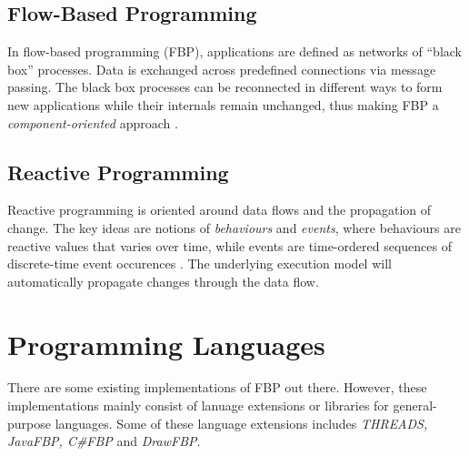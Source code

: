 \subsection{Flow-Based Programming}
In flow-based programming (FBP), applications are defined as networks
of ``black box'' processes. Data is exchanged across predefined
connections via message passing. The black box processes can be
reconnected in different ways to form new applications while their
internals remain unchanged, thus making FBP a
\emph{component-oriented} approach
\citep{morrison:2010,morrison:online}.


\subsection{Reactive Programming}
Reactive programming is oriented around data flows and the propagation
of change. The key ideas are notions of \emph{behaviours} and
\emph{events}, where behaviours are reactive values that varies over
time, while events are time-ordered sequences of discrete-time event
occurences \citep{wan:2000}. The underlying execution model will
automatically propagate changes through the data flow.


\section{Programming Languages}
There are some existing implementations of FBP out there. However,
these implementations mainly consist of lanuage extensions or
libraries for general-purpose languages. Some of these language
extensions includes \emph{THREADS, JavaFBP, C\#FBP} and
\emph{DrawFBP}.\citep{morrison:2010}
